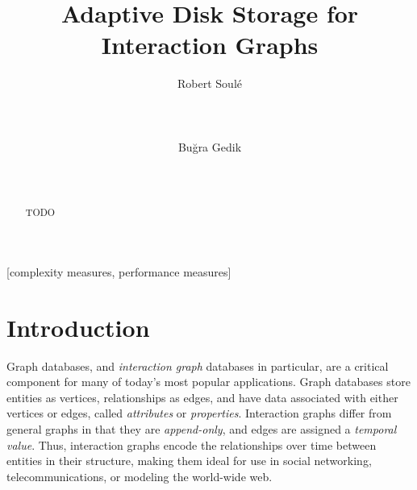 



%

\title{Adaptive Disk Storage for Interaction Graphs}


\author{
\alignauthor
Robert Soul\'{e}\\
       \\
       \\
       \\
\alignauthor
Bu\u{g}ra Gedik\\
       \\
       \\
}


\maketitle
\begin{abstract}
TODO
\end{abstract}

[complexity measures, performance measures]



\section{Introduction}


Graph databases, and \emph{interaction graph} databases in
particular, are a critical component for many of today's most popular
applications.  Graph databases store entities as vertices, relationships as
edges, and have data associated with either vertices or edges, called
\emph{attributes} or \emph{properties}.  Interaction graphs differ from general
graphs in that they are \emph{append-only}, and edges are assigned a
\emph{temporal value}.  Thus, interaction graphs encode the relationships over
time between entities in their structure, making them ideal for use in social
networking, telecommunications, or modeling the world-wide web.

